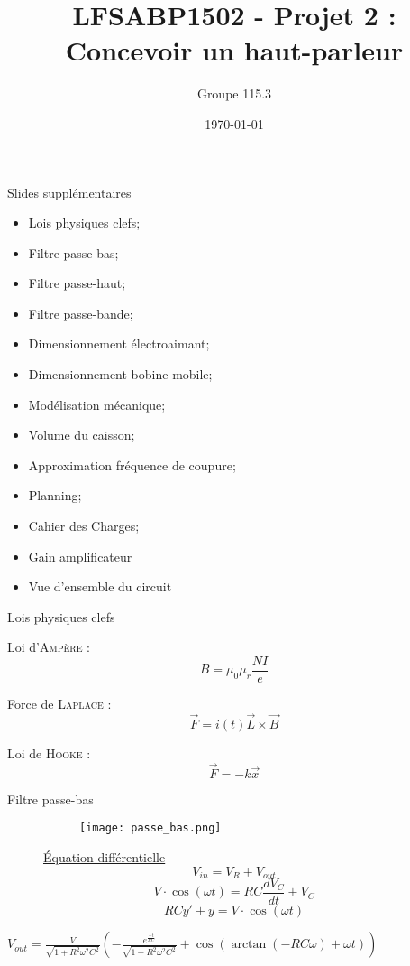 \documentclass[pdf]{beamer}
\title{LFSABP1502 - Projet 2 : Concevoir un haut-parleur}
\author{Groupe 115.3}
\date{\today}
\begin{document}
\begin{frame}{Slides supplémentaires}
\begin{itemize}
\item  Lois physiques clefs;
\item  Filtre passe-bas;
\item  Filtre passe-haut;
\item  Filtre passe-bande;
\item  Dimensionnement électroaimant;
\item  Dimensionnement bobine mobile;
\item  Modélisation mécanique;
\item  Volume du caisson;
\item  Approximation fréquence de coupure;
\item  Planning;
\item  Cahier des Charges;
\item  Gain amplificateur
\item  Vue d'ensemble du circuit
\end{itemize}
\end{frame}
\begin{frame}{Lois physiques clefs}

Loi d'\textsc{Ampère} :
$$B = \mu_0\mu_r\frac{NI}{e}$$

Force de \textsc{Laplace} :
$$\vec{F} = i(t)\vec{L}\times{\vec{B}}$$ 

Loi de \textsc{Hooke} :
$$\vec{F} = -k \vec{x}$$ 

\end{frame}

\begin{frame}{Filtre passe-bas}

	\begin{figure}[ht]
\begin{figure}[ht!]
    \centering
    \texttt{[image: passe\_bas.png]}
\end{figure}
\endminipage\hfill
{}
\underline{Équation différentielle}
$$V_{in} = V_R + V_{out}$$
$$V \cdot \cos (\omega t) = RC\frac{dV_C}{dt} + V_C$$
$$RCy' + y = V \cdot \cos (\omega t)$$
\endminipage\hfill
\end{figure}
$V_{out} = \frac{V}{\sqrt{1 + R^2\omega^2C^2}}
\left(-\frac{e^{\frac{-t}{RC}}}{\sqrt{1 + R^2\omega^2C^2}} + \cos(\arctan(-RC\omega) + \omega t)\right)
$

\end{frame}
\end{document}
